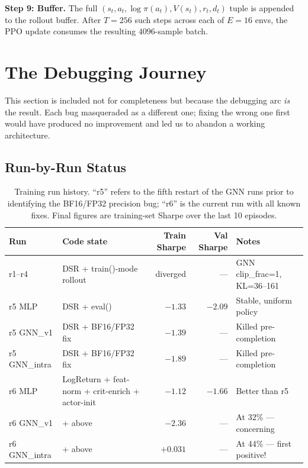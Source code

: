 \documentclass[11pt,a4paper]{article}
\begin{document}
\textbf{Step 9: Buffer.} The full $(s_t, a_t, \log \pi(a_t), V(s_t), r_t, d_t)$
tuple is appended to the rollout buffer. After $T = 256$ such steps across each of
$E = 16$ envs, the PPO update consumes the resulting $4096$-sample batch.

\section{The Debugging Journey}
\label{sec:debug}

This section is included not for completeness but because the debugging arc
\emph{is} the result. Each bug masqueraded as a different one; fixing the wrong one
first would have produced no improvement and led us to abandon a working
architecture.

\subsection{Run-by-Run Status}

\begin{table}[h]
\centering
\caption{Training run history. ``r5'' refers to the fifth restart of the GNN runs
prior to identifying the BF16/FP32 precision bug; ``r6'' is the current run with all
known fixes. Final figures are training-set Sharpe over the last 10 episodes.}
\scriptsize
\begin{tabularx}{\textwidth}{l X r r X}
\toprule
\textbf{Run} & \textbf{Code state} & \textbf{Train Sharpe} & \textbf{Val Sharpe} & \textbf{Notes} \\
\midrule
r1--r4 & DSR + train()-mode rollout & diverged & --- & GNN clip\_frac=1, KL=36--161 \\
r5 MLP & DSR + eval() & $-1.33$ & $-2.09$ & Stable, uniform policy \\
r5 GNN\_v1 & DSR + BF16/FP32 fix & $-1.39$ & --- & Killed pre-completion \\
r5 GNN\_intra & DSR + BF16/FP32 fix & $-1.89$ & --- & Killed pre-completion \\
\midrule
r6 MLP & LogReturn + feat-norm + crit-enrich + actor-init & $-1.12$ & $-1.66$ & Better than r5 \\
r6 GNN\_v1 & + above & $-2.36$ & --- & At 32\% --- concerning \\
r6 GNN\_intra & + above & $\mathbf{+0.031}$ & --- & At 44\% --- first positive! \\
\bottomrule
\end{tabularx}
\end{table}
\end{document}
